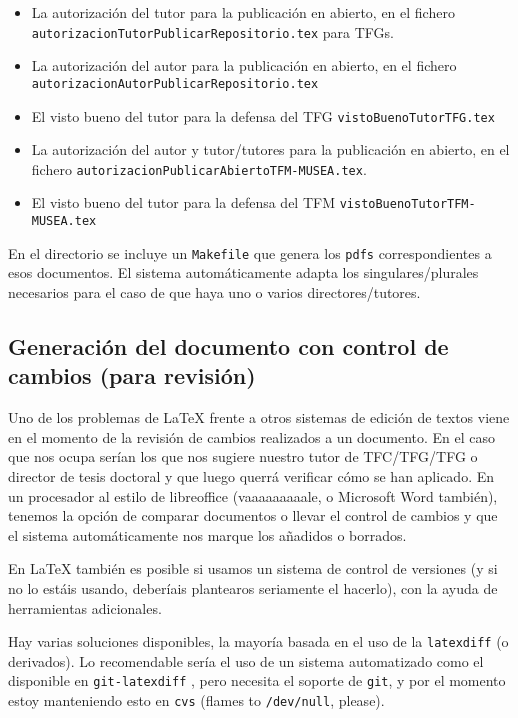 \begin{itemize}
\item La autorización del tutor para la publicación en abierto, en el
  fichero \texttt{autorizacionTutorPublicarRepositorio.tex} para TFGs.
\item La autorización del autor para la publicación en abierto, en el
  fichero \texttt{autorizacionAutorPublicarRepositorio.tex}
\item El visto bueno del tutor para la defensa del TFG
  \texttt{vistoBuenoTutorTFG.tex}
\item La autorización del autor y tutor/tutores para la publicación en
  abierto, en el fichero
  \texttt{autorizacionPublicarAbiertoTFM-MUSEA.tex}.
\item El visto bueno del tutor para la defensa del TFM
  \texttt{vistoBuenoTutorTFM-MUSEA.tex}
\end{itemize}

En el directorio se incluye un \texttt{Makefile} que genera los
\texttt{pdfs} correspondientes a esos documentos. El sistema
automáticamente adapta los singulares/plurales necesarios para el caso
de que haya uno o varios directores/tutores.
 

\subsection{Generación del documento con control de cambios (para revisión)}
\label{sec:control-de-cambios}

Uno de los problemas de \LaTeX{} frente a otros sistemas de edición de
textos viene en el momento de la revisión de cambios realizados a un
documento. En el caso que nos ocupa serían los que nos sugiere nuestro
tutor de TFC/TFG/TFG o director de tesis doctoral y que luego querrá
verificar cómo se han aplicado. En un procesador al estilo de
libreoffice (vaaaaaaaaale, o Microsoft Word también), tenemos la opción
de comparar documentos o llevar el control de cambios y que el sistema
automáticamente nos marque los añadidos o borrados. 

En \LaTeX{} también es posible si usamos un sistema de control de
versiones (y si no lo estáis usando, deberíais plantearos seriamente el
hacerlo), con la ayuda de herramientas adicionales.

Hay varias soluciones disponibles, la mayoría basada en el uso de la
\texttt{latexdiff} \cite{latexdiff} (o derivados). Lo recomendable sería
el uso de un sistema automatizado como el disponible en
\texttt{git-latexdiff} \cite{git-latexdiff}, pero necesita el soporte de
\texttt{git}, y por el momento estoy manteniendo esto en \texttt{cvs}
(flames to \texttt{/dev/null}, please).

